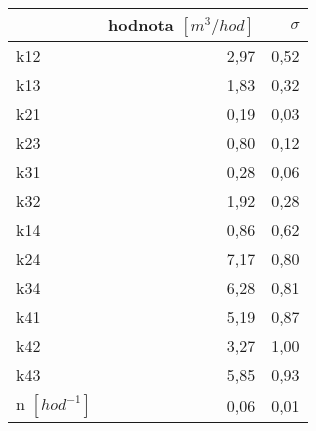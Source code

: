 \begin{tabular}{lrr}
\toprule
{} &  hodnota $\left[\si{m^3/hod}\right]$ &  $\sigma$ \\
\midrule
k12                 &                                 2,97 &      0,52 \\
k13                 &                                 1,83 &      0,32 \\
k21                 &                                 0,19 &      0,03 \\
k23                 &                                 0,80 &      0,12 \\
k31                 &                                 0,28 &      0,06 \\
k32                 &                                 1,92 &      0,28 \\
k14                 &                                 0,86 &      0,62 \\
k24                 &                                 7,17 &      0,80 \\
k34                 &                                 6,28 &      0,81 \\
k41                 &                                 5,19 &      0,87 \\
k42                 &                                 3,27 &      1,00 \\
k43                 &                                 5,85 &      0,93 \\
n $[\si{hod^{-1}}]$ &                                 0,06 &      0,01 \\
\bottomrule
\end{tabular}
